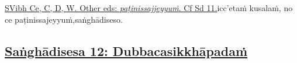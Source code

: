{{{		\hypertarget{endnote79-appendix}{\hyperlink{endnote79-body}{SVibh Ce, C, D, W. Other eds: \textit{paṭinissajjeyyuṁ}. Cf Sd 11.}}}}}\makeatother \thinspace icc'etaṁ kusalaṁ, no ce paṭinissajeyyuṁ,\makeatletter\hyperlink{endnote80-appendix}\makeatother \thinspace saṅghādiseso.



\subsection*{\hyperref[comm12]{Saṅghādisesa 12: Dubbacasikkhāpadaṁ}}
\label{sd12}

